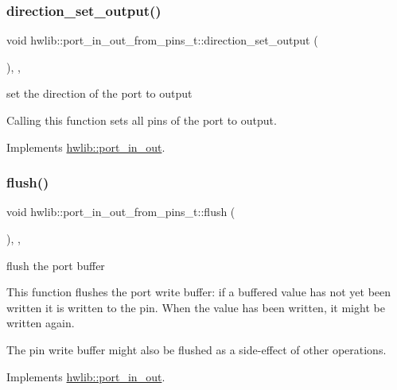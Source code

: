 \subsubsection{\texorpdfstring{direction\+\_\+set\+\_\+output()}{direction\_set\_output()}}
{\footnotesize\ttfamily void hwlib\+::port\+\_\+in\+\_\+out\+\_\+from\+\_\+pins\+\_\+t\+::direction\+\_\+set\+\_\+output (\begin{DoxyParamCaption}{ }\end{DoxyParamCaption})\hspace{0.3cm}{\ttfamily [inline]}, {\ttfamily [override]}, {\ttfamily [virtual]}}

set the direction of the port to output

Calling this function sets all pins of the port to output. 

Implements \hyperlink{classhwlib_1_1port__in__out_a515b4a6bbde4f2df5bb11cda41234fe4}{hwlib\+::port\+\_\+in\+\_\+out}.

\mbox{\label{classhwlib_1_1port__in__out__from__pins__t_ad93519fe8087b7b65f35442f8c505ccf}} 
\subsubsection{\texorpdfstring{flush()}{flush()}}
{\footnotesize\ttfamily void hwlib\+::port\+\_\+in\+\_\+out\+\_\+from\+\_\+pins\+\_\+t\+::flush (\begin{DoxyParamCaption}{ }\end{DoxyParamCaption})\hspace{0.3cm}{\ttfamily [inline]}, {\ttfamily [override]}, {\ttfamily [virtual]}}

flush the port buffer

This function flushes the port write buffer\+: if a buffered value has not yet been written it is written to the pin. When the value has been written, it might be written again.

The pin write buffer might also be flushed as a side-\/effect of other operations. 

Implements \hyperlink{classhwlib_1_1port__in__out_a164564bcd08c137f0ff2e6445e9cfe5e}{hwlib\+::port\+\_\+in\+\_\+out}.

